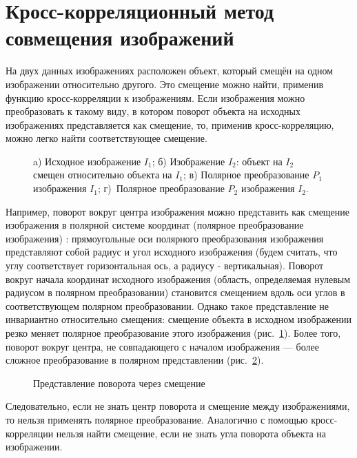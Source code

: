 \documentclass[oneside,final,14pt]{extreport}
\begin{document}
\section{Кросс-корреляционный метод совмещения изображений}
На двух данных изображениях расположен объект, который смещён на одном изображении относительно другого. Это смещение можно найти, применив функцию кросс-корреляции к изображениям. Если изображения можно преобразовать к такому виду, в котором поворот объекта на исходных изображениях представляется как смещение, то, применив кросс-корреляцию, можно легко найти соответствующее смещение.
\begin{figure}[th!]
\centering

\caption{a) Исходное изображение \(I_1\); б) Изображение \(I_2\): объект на  \(I_2\) смещен относительно объекта на \(I_1\); в) Полярное преобразование \(P_1\) изображения \(I_1\); г)~Полярное преобразование \(P_2\)  изображения \(I_2\).}
\label{polar}
\end{figure}
Например, поворот вокруг центра изображения можно представить как смещение изображения в полярной системе координат (полярное преобразование изображения) \cite{reddy1996fft}: прямоугольные оси полярного преобразования изображения представляют собой радиус и угол исходного изображения (будем считать, что углу соответствует горизонтальная ось, а радиусу - вертикальная). Поворот вокруг начала координат исходного изображения (область, определяемая нулевым радиусом в полярном преобразовании) становится смещением вдоль оси углов в соответствующем полярном преобразовании. Однако такое представление не инвариантно относительно смещения: смещение объекта в исходном изображении резко меняет полярное преобразование этого изображения (рис.~\ref{polar}). Более того, поворот вокруг центра, не совпадающего с началом изображения --- более сложное преобразование в полярном представлении (рис.~\ref{fft}).
\begin{figure}[h!]
\centering
\caption{Представление поворота через смещение}
\label{fft}
\end{figure}
Следовательно, если не знать центр поворота и смещение между изображениями, то нельзя применять полярное преобразование. Аналогично с помощью кросс-корреляции нельзя найти смещение, если не знать угла поворота объекта на изображении.
\end{document}
